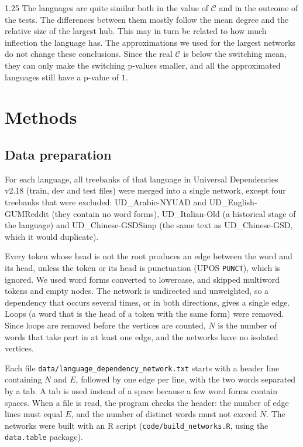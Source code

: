 \documentclass[12pt]{article}
\newcommand{\metric}{\mathcal{C}}
\begin{document}
\begin{spacing}{1.25}
The languages are quite similar both in the value of $\metric$ and in the outcome of the tests. The differences between them mostly follow the mean degree and the relative size of the largest hub. This may in turn be related to how much inflection the language has. The approximations we used for the largest networks do not change these conclusions. Since the real $\metric$ is below the switching mean, they can only make the switching p-values smaller, and all the approximated languages still have a p-value of $1$.


\section{Methods}

\subsection{Data preparation}
For each language, all treebanks of that language in Universal Dependencies v2.18 (train, dev and test files) were merged into a single network, except four treebanks that were excluded: UD\_Arabic-NYUAD and UD\_English-GUMReddit (they contain no word forms), UD\_Italian-Old (a historical stage of the language) and UD\_Chinese-GSDSimp (the same text as UD\_Chinese-GSD, which it would duplicate).

Every token whose head is not the root produces an edge between the word and its head, unless the token or its head is punctuation (UPOS \texttt{PUNCT}), which is ignored. We used word forms converted to lowercase, and skipped multiword tokens and empty nodes. The network is undirected and unweighted, so a dependency that occurs several times, or in both directions, gives a single edge. Loops (a word that is the head of a token with the same form) were removed. Since loops are removed before the vertices are counted, $N$ is the number of words that take part in at least one edge, and the networks have no isolated vertices.

Each file \texttt{data/language\_dependency\_network.txt} starts with a header line containing $N$ and $E$, followed by one edge per line, with the two words separated by a tab. A tab is used instead of a space because a few word forms contain spaces. When a file is read, the program checks the header: the number of edge lines must equal $E$, and the number of distinct words must not exceed $N$. The networks were built with an R script (\texttt{code/build\_networks.R}, using the \texttt{data.table} package).


\end{spacing}
\end{document}
